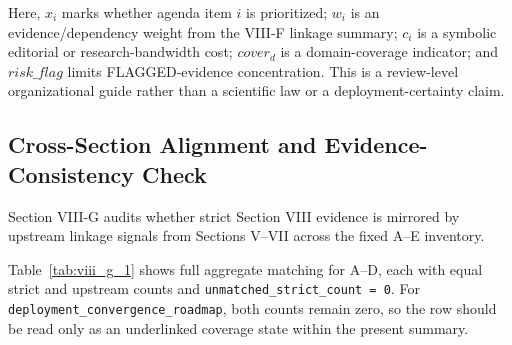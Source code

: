\documentclass[letterpaper,journal]{IEEEtran}
\begin{document}
Here, $x_i$ marks whether agenda item $i$ is prioritized; $w_i$ is an evidence/dependency weight from the VIII-F linkage summary; $c_i$ is a symbolic editorial or research-bandwidth cost; $cover_d$ is a domain-coverage indicator; and $risk\_flag$ limits FLAGGED-evidence concentration. This is a review-level organizational guide rather than a scientific law or a deployment-certainty claim.

\subsection{Cross-Section Alignment and Evidence-Consistency Check}

Section VIII-G audits whether strict Section VIII evidence is mirrored by upstream linkage signals from Sections V--VII across the fixed A--E inventory.

Table~\ref{tab:viii_g_1} shows full aggregate matching for A--D, each with equal strict and upstream counts and \texttt{unmatched\_strict\_count = 0}. For \texttt{deployment\_convergence\_roadmap}, both counts remain zero, so the row should be read only as an underlinked coverage state within the present summary.
\end{document}
